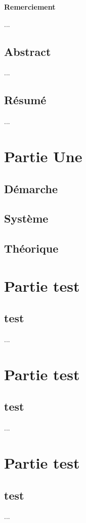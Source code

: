 \documentclass[answers,a4paper,twoside]{School-Work-Template}
\begin{document}
\newpage
\thispagestyle{empty}
\begin{center}
	\textbf{{\Large Remerciement}}
\end{center}
...
\newpage
\thispagestyle{empty}
\section*{Abstract}%
...
\newpage
\thispagestyle{empty}
\section*{Résumé}%
...
\newpage
\tableofcontents


\newpage
\chapter{Partie Une}
\section{Démarche}

\newpage
\section{Système}

\newpage
\section{Théorique}

\newpage
\chapter{Partie test}
\section{test}
...
\chapter{Partie test}
\section{test}
...
\chapter{Partie test}
\section{test}
...
\end{document}
